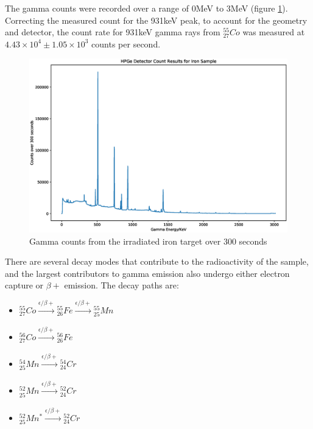 The gamma counts were recorded over a range of 0MeV to 3MeV (figure \ref{fig:measuredgammacounts}). Correcting the measured count for the 931keV peak, to account for the geometry and detector, the count rate for 931keV gamma rays from ${}^{55}_{27} Co$ was measured at $4.43\times10^4 \pm 1.05 \times 10^3$ counts per second.

\begin{figure}[ht] 
  \centering
  \begin{minipage}[b]{0.85\linewidth}
    \centering
    \includegraphics[width=.9\linewidth]{chapters/activity_code/experimental/gamma_counts.eps} 
    \caption{Gamma counts from the irradiated iron target over 300 seconds}  
    \label{fig:measuredgammacounts}
  \end{minipage}%
\end{figure}

There are several decay modes that contribute to the radioactivity of the sample, and the largest contributors to gamma emission also undergo either electron capture or $\beta +$ emission.  The decay paths are:

\begin{itemize}
\item ${}^{55}_{27}Co \xrightarrow[]{\epsilon/\beta +} {}^{55}_{26}Fe \xrightarrow[]{\epsilon/\beta +} {}^{55}_{25}Mn$
\item ${}^{56}_{27}Co \xrightarrow[]{\epsilon/\beta +} {}^{56}_{26}Fe$
\item ${}^{54}_{25}Mn \xrightarrow[]{\epsilon/\beta +} {}^{54}_{24}Cr$
\item ${}^{52}_{25}Mn \xrightarrow[]{\epsilon/\beta +} {}^{52}_{24}Cr$ 
\item ${}^{52}_{25}Mn^{*} \xrightarrow[]{\epsilon/\beta +} {}^{52}_{24}Cr$
\end{itemize}

